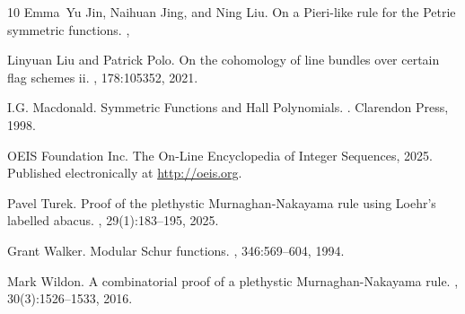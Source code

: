 \documentclass[pdflatex,sn-mathphys-num]{sn-jnl}%
\theoremstyle{thmstyleone}%
\theoremstyle{thmstyletwo}%
\theoremstyle{thmstylethree}%
\numberwithin{equation}{section}
\begin{document}
\begin{thebibliography}{10}
Emma~Yu Jin, Naihuan Jing, and Ning Liu.
\newblock On a Pieri-like rule for the Petrie symmetric functions.
, %

Linyuan Liu and Patrick Polo.
\newblock On the cohomology of line bundles over certain flag schemes ii.
, 178:105352, 2021.

I.G. Macdonald.
\newblock Symmetric Functions and Hall Polynomials.
. Clarendon Press, 1998.

{OEIS Foundation Inc.}
\newblock The {O}n-{L}ine {E}ncyclopedia of {I}nteger {S}equences, 2025.
\newblock Published electronically at \url{http://oeis.org}.

Pavel Turek.
\newblock Proof of the plethystic {M}urnaghan-{N}akayama rule using {L}oehr's
  labelled abacus.
, 29(1):183--195, 2025.

Grant Walker.
\newblock Modular Schur functions.
,
  346:569--604, 1994.

Mark Wildon.
\newblock A combinatorial proof of a plethystic {M}urnaghan-{N}akayama rule.
, 30(3):1526--1533, 2016.

\end{thebibliography}
\end{document}
